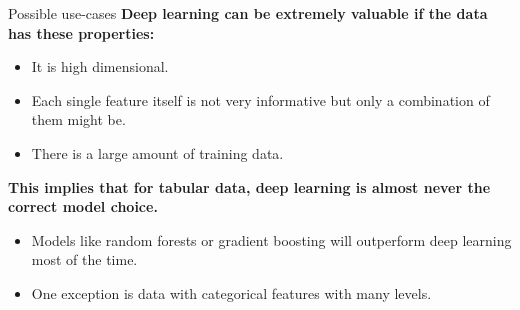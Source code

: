 \begin{frame} {Possible use-cases}
\textbf{Deep learning can be extremely valuable if the data has these properties:}
\vspace{.2cm}
\begin{itemize}
\item It is high dimensional.
\item Each single feature itself is not very informative but only a combination of them might be.
\item There is a large amount of training data.
\end{itemize}
\vspace{.7cm}
\textbf{This implies that for tabular data, deep learning is almost never the correct model choice.}
\vspace{.2cm}
\begin{itemize}
\item Models like random forests or gradient boosting will outperform deep learning most of the time.
\item One exception is data with categorical features with many levels.
\end{itemize}

\end{frame}

